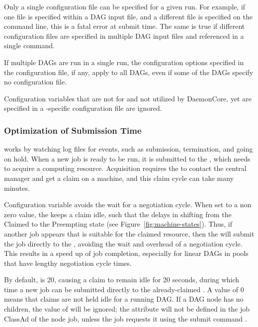 Only a single configuration file can be specified for a given
 run.  For example, if one file is specified within a DAG
input file,
and a different file is specified on the  command
line, this is a fatal error at submit time.
The same is true if
different configuration files are specified in multiple DAG input files
and referenced in a single  command.

If multiple DAGs are run in a single  run, 
the configuration options specified in the  configuration
file, if any, apply to all DAGs, even if some of the DAGs specify no
configuration file.

Configuration variables that are not for 
and not utilized by DaemonCore, yet are specified in a
-specific configuration file are ignored.

\subsubsection{\label{sec:MultipleDAGs}Optimization of Submission Time}

 works by watching log files for events, such as submission,
termination, and going on hold.
When a new job is ready to be run, it is submitted to the , 
which needs to acquire a computing resource. 
Acquisition requires the  to contact the central
manager and get a claim on a machine,
and this claim cycle can take many minutes.

Configuration variable
avoids the wait for a negotiation cycle.
When set to a non zero value, 
the  keeps a claim idle,
such that the  delays in shifting from
the Claimed to the Preempting state (see Figure~\ref{fig:machine-states}).
Thus, if another job appears that is suitable for the claimed resource,
then the  will submit the job directly to the , 
avoiding the wait and overhead of a negotiation cycle.
This results in a speed up of job completion,
especially for linear DAGs in pools that have lengthy negotiation cycle times.

By default,  is 20, 
causing a claim to remain idle for 20 seconds, 
during which time a new job can be submitted
directly to the already-claimed . 
A value of 0 means that claims are not held idle for a running DAG.
If a DAG node has no children,
the value of  will be ignored;
the  attribute will not be defined in the job ClassAd 
of the node job, unless the job requests it using the submit command
. 

